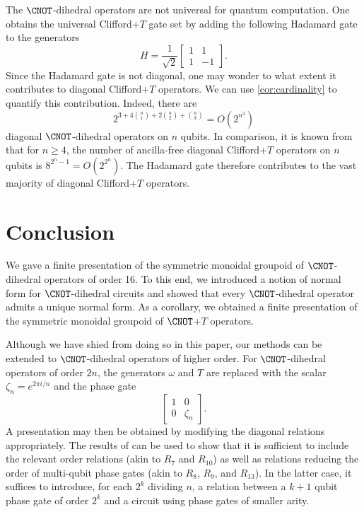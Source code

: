 \documentclass{eptcs}
\begin{document}
\begin{remark}
  \label{rem:hadamard}
  The $\CNOT$-dihedral operators are not universal for quantum
  computation. One obtains the universal Clifford+$T$ gate set by
  adding the following Hadamard gate to the generators
  \[
    H = \frac{1}{\sqrt 2}\begin{bmatrix}
      1 & 1 \\
      1 & -1
    \end{bmatrix}.
  \]
  Since the Hadamard gate is not diagonal, one may wonder to what
  extent it contributes to diagonal Clifford+$T$ operators. We can use
  \cref{cor:cardinality} to quantify this contribution. Indeed, there
  are
  \[
    2^{3 + 4\binom{n}{1} + 2\binom{n}{2} + \binom{n}{3}} = O(2^{n^3})
  \]
  diagonal $\CNOT$-dihedral operators on $n$ qubits. In comparison, it
  is known from \cite{GS13} that for $n\geq 4$, the number of
  ancilla-free diagonal Clifford+$T$ operators on $n$ qubits is
  $8^{2^n-1} = O(2^{2^n})$. The Hadamard gate therefore contributes to
  the vast majority of diagonal Clifford+$T$ operators.
\end{remark}

\section{Conclusion}
\label{sec:conc}

We gave a finite presentation of the symmetric monoidal groupoid of
$\CNOT$-dihedral operators of order 16. To this end, we introduced a
notion of normal form for $\CNOT$-dihedral circuits and showed that
every $\CNOT$-dihedral operator admits a unique normal form. As a
corollary, we obtained a finite presentation of the symmetric monoidal
groupoid of $\CNOT$+$T$ operators.

Although we have shied from doing so in this paper, our methods can be
extended to $\CNOT$-dihedral operators of higher order. For
$\CNOT$-dihedral operators of order $2n$, the generators $\omega$ and
$T$ are replaced with the scalar $\zeta_n = e^{2\pi i / n}$ and the
phase gate
\[
  \begin{bmatrix}
    1 & 0 \\
    0 & \zeta_n
  \end{bmatrix}.
\]
A presentation may then be obtained by modifying the diagonal
relations appropriately. The results of \cite{AM} can be used to show
that it is sufficient to include the relevant order relations (akin to
$R_7$ and $R_{10}$) as well as relations reducing the order of
multi-qubit phase gates (akin to $R_8$, $R_9$, and $R_{13}$). In the
latter case, it suffices to introduce, for each $2^k$ dividing $n$, a
relation between a $k+1$ qubit phase gate of order $2^k$ and a circuit
using phase gates of smaller arity.
\end{document}
